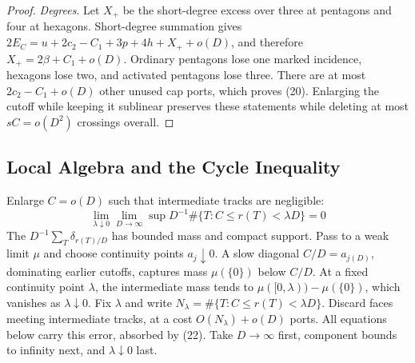 \documentclass[10pt,reqno]{amsart}
\begin{document}
\begin{proof}
    \textit{Degrees}. Let $X_+$ be the short-degree excess over three at pentagons and four at hexagons. Short-degree summation gives $2E_C = u + 2c_2 - C_1 + 3p + 4h + X_+ + o(D)$, and therefore $X_+ = 2 \beta + C_1 + o(D)$. Ordinary pentagons lose one marked incidence, hexagons lose two, and activated pentagons lose three. There are at most $2c_2 - C_1 + o(D)$ other unused cap ports, which proves (20). Enlarging the cutoff while keeping it sublinear preserves these statements while deleting at most $sC = o(D^2)$ crossings overall.
\end{proof}


\subsection{Local Algebra and the Cycle Inequality}



Enlarge $C = o(D)$ such that intermediate tracks are negligible:
\begin{equation}
    \lim_{\lambda \downarrow 0} \lim_{D \to \infty} \sup D^{-1} \# \{T : C \le r(T) < \lambda D\} = 0
\end{equation}
The $D^{-1} \sum_T \delta_{r(T) / D}$ has bounded mass and compact support. Pass to a weak limit $\mu$ and choose continuity points $a_j \downarrow 0$. A slow diagonal $C / D = a_{j(D)}$, dominating earlier cutoffs, captures mass $\mu (\{0\})$ below $C / D$. At a fixed continuity point $\lambda$, the intermediate mass tends to $\mu([0, \lambda)) - \mu(\{0\})$, which vanishes as $\lambda \downarrow 0$. Fix $\lambda$ and write $N_\lambda = \# \{T : C \le r(T) < \lambda D\}$. Discard faces meeting intermediate tracks, at a cost $O(N_\lambda) + o(D)$ ports. All equations below carry this error, absorbed by (22). Take $D \to \infty$ first, component bounds to infinity next, and $\lambda \downarrow 0$ last.
\end{document}
